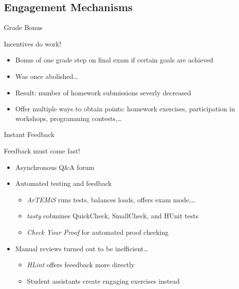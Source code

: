\documentclass{beamer}
\begin{document}
\subsection{Engagement Mechanisms}
\begin{frame}{Grade Bonus}
\centerline{\Large{\alert{Incentives do work!}}}
\pause
\begin{itemize}[<+->]
\item Bonus of one grade step on final exam if certain goals are achieved
\item Was once abolished\dots\\
\item[] Result: number of homework submissions severly decreased
\item Offer multiple ways to obtain points: homework exercises, participation in workshops, programming contests,\dots
\end{itemize}
\end{frame}

\begin{frame}{Instant Feedback}
\centerline{\Large{\alert{Feedback must come fast!}}}
\pause
\begin{itemize}[<+->]
\item Asynchronous Q\&A forum
\item Automated testing and feedback
\begin{itemize}
  \item \emph{ArTEMiS} runs tests, balances loads, offers exam mode,\dots
  \item \emph{tasty} cobmines QuickCheck, SmallCheck, and HUnit tests
  \item \emph{Check Your Proof} for automated proof checking
\end{itemize}
\item Manual reviews turned out to be inefficient\dots
\begin{itemize}
  \item \emph{HLint} offers feeedback more directly
  \item Student assistants create engaging exercises instead
\end{itemize}
\end{itemize}
\end{frame}
\end{document}
